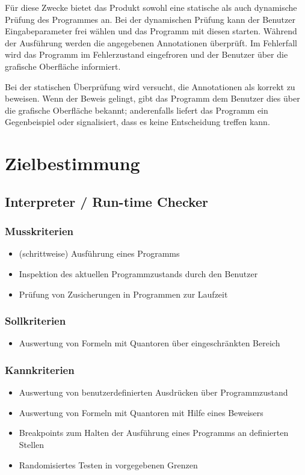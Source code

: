 \documentclass[a4paper,10pt]{article}
\begin{document}
F\"{u}r diese Zwecke bietet das Produkt sowohl eine statische als auch dynamische Pr\"{u}fung des Programmes an. Bei der dynamischen Pr\"{u}fung kann der Benutzer Eingabeparameter frei w\"{a}hlen und das Programm mit diesen starten. W\"{a}hrend der Ausf\"{u}hrung werden die angegebenen Annotationen \"{u}berpr\"{u}ft. Im Fehlerfall wird das Programm im Fehlerzustand eingefroren und der Benutzer \"{u}ber die grafische Oberfl\"{a}che informiert.

Bei der statischen \"{U}berpr\"{u}fung wird versucht, die Annotationen als korrekt zu beweisen. Wenn der Beweis gelingt, gibt das Programm dem Benutzer dies \"{u}ber die grafische Oberfl\"{a}che bekannt; anderenfalls liefert das Programm ein Gegenbeispiel oder signalisiert, dass es keine Entscheidung treffen kann.

\section{Zielbestimmung}
\subsection{Interpreter / Run-time Checker}
\subsubsection{Musskriterien}
\begin{itemize}
  \item (schrittweise) Ausf\"{u}hrung eines Programms
  \item Inspektion des aktuellen Programmzustands durch den Benutzer
  \item Pr\"{u}fung von Zusicherungen in Programmen zur Laufzeit
\end{itemize}
\subsubsection{Sollkriterien}
\begin{itemize}
  \item Auswertung von Formeln mit Quantoren \"{u}ber eingeschr\"{a}nkten Bereich
\end{itemize}
\subsubsection{Kannkriterien}
\begin{itemize}
  \item Auswertung von benutzerdefinierten Ausdr\"{u}cken \"{u}ber Programmzustand
  \item Auswertung von Formeln mit Quantoren mit Hilfe eines Beweisers
  \item Breakpoints zum Halten der Ausf\"{u}hrung eines Programms an definierten Stellen
  \item Randomisiertes Testen in vorgegebenen Grenzen
\end{itemize}
\end{document}
